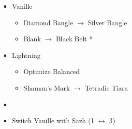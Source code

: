 \begin{menu}
\begin{itemize}
\begin{itemize}
\begin{itemize}
			      \end{itemize}
			\item Vanille
			      \begin{itemize}
				      \item Diamond Bangle $\rightarrow$ Silver Bangle
				      \item Blank $\rightarrow$ Black Belt *
			      \end{itemize}
			\item Lightning
			      \begin{itemize}
				      \item Optimize Balanced
				      \item Shaman's Mark $\rightarrow$ Tetradic Tiara
			      \end{itemize}
		\end{itemize}
		\paradigm
		\begin{itemize}
			\item {}%
			      {\paradigmline{(\com)}{(\com)}{\com}}%
			      {\paradigmline[2]{\textit{(\com)}}{\textit{(\com)}}{\textit{\com}}}%
			      {\paradigmline{(\sab)}{\sen}{\syn}}%
			      {\paradigmline{\med}{\rav}{[\syn]}}%
			      {\paradigmline{\med}{\rav}{[\rav]}}%
			      {\paradigmline{[\rav]}{\rav}{\rav}}
			\item Switch Vanille with Sazh (1 $\leftrightarrow$ 3)
		\end{itemize}
	\end{itemize}
\end{menu}

\renewcommand{\first}{[1] Cerberus (\com/\com/\com)}
\renewcommand{\second}{[2] Cerberus (\com/\com/\com)}
\renewcommand{\third}{[3] Premeditation (\syn/\sen/\sab)}
\renewcommand{\fourth}{[4] Coordination (\syn/\rav/\med)}
\renewcommand{\fifth}{[5] Thaumaturgy (\rav/\rav/\med)}
\renewcommand{\sixth}{[6] Tri-Disaster (\rav/\rav/\rav)}

